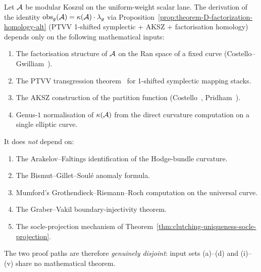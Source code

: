 \begin{theorem}
\label{thm:H04-PTVV-alternative-disjoint}
Let $\mathcal{A}$ be modular Koszul on the uniform-weight scalar lane.
The derivation of the identity
$\mathrm{obs}_g(\mathcal{A}) = \kappa(\mathcal{A})\cdot\lambda_g$ via
Proposition~\ref{prop:theorem-D-factorization-homology-alt}
(PTVV 1-shifted symplectic + AKSZ + factorisation homology)
depends only on the following mathematical inputs:
\begin{enumerate}[label=\textup{(\alph*)}]
\item The factorisation structure of $\mathcal{A}$ on the Ran space of a
fixed curve (Costello--Gwilliam~\cite{CG17,CG-vol2}).
\item The PTVV transgression
theorem~\cite{PTVV13} for 1-shifted symplectic mapping stacks.
\item The AKSZ construction of the partition function
(Costello~\cite{Costello17}, Pridham~\cite{Pridham17}).
\item Genus-$1$ normalisation of $\kappa(\mathcal{A})$ from the direct
curvature computation on a single elliptic curve.
\end{enumerate}
It does \emph{not} depend on:
\begin{enumerate}[label=\textup{(\roman*)}]
\item The Arakelov--Faltings identification of the Hodge-bundle
curvature.
\item The Bismut--Gillet--Soul\'e anomaly formula.
\item Mumford's Grothendieck--Riemann--Roch computation on the
universal curve.
\item The Graber--Vakil boundary-injectivity theorem.
\item The socle-projection mechanism of
Theorem~\ref{thm:clutching-uniqueness-socle-projection}.
\end{enumerate}
The two proof paths are therefore \emph{genuinely disjoint}:
input sets (a)--(d) and (i)--(v) share no mathematical theorem.
\end{theorem}

